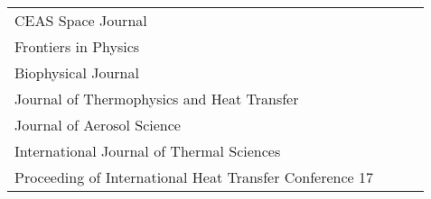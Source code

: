 \begin{longtable}{p{.55\linewidth}P{.08\linewidth}P{.11\linewidth}P{.11\linewidth}}
CEAS Space Journal &  &  & \makecell{} \\
Frontiers in Physics &  &  &  \\
Biophysical Journal &  &  &  \\
Journal of Thermophysics and Heat Transfer &  &  & \makecell{} \\
Journal of Aerosol Science &  &  & \makecell{} \\
International Journal of Thermal Sciences &  &  & \makecell{} \\
Proceeding of International Heat Transfer Conference 17 &  &  & \makecell{} \\
\bottomrule
\end{longtable}
